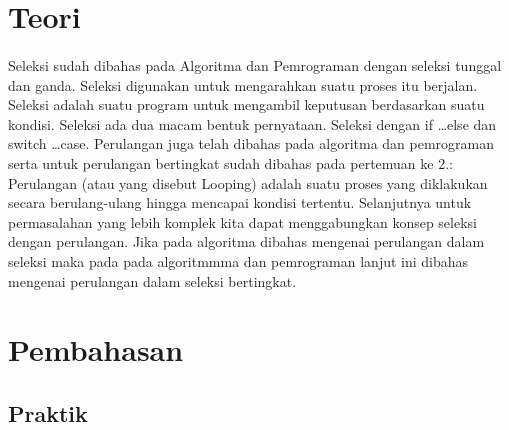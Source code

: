 \documentclass[a4paper,12pt]{article}
\begin{document}
\section{Teori}
\paragraph{}
Seleksi sudah dibahas pada Algoritma dan Pemrograman dengan seleksi tunggal dan ganda.
Seleksi digunakan untuk mengarahkan suatu proses itu berjalan. Seleksi adalah suatu program
untuk mengambil keputusan berdasarkan suatu kondisi. Seleksi ada dua macam bentuk
pernyataan. Seleksi dengan if \ldots else dan switch \ldots case.
Perulangan juga telah dibahas pada algoritma dan pemrograman serta untuk perulangan
bertingkat sudah dibahas pada pertemuan ke 2.: Perulangan (atau yang disebut Looping) adalah
suatu proses yang diklakukan secara berulang-ulang hingga mencapai kondisi tertentu.
Selanjutnya untuk permasalahan yang lebih komplek kita dapat menggabungkan konsep
seleksi dengan perulangan. Jika pada algoritma dibahas mengenai perulangan dalam seleksi
maka pada pada algoritmmma dan pemrograman lanjut ini dibahas mengenai perulangan dalam
seleksi bertingkat.
\newpage

\section{Pembahasan}
\subsection{Praktik}
\end{document}
